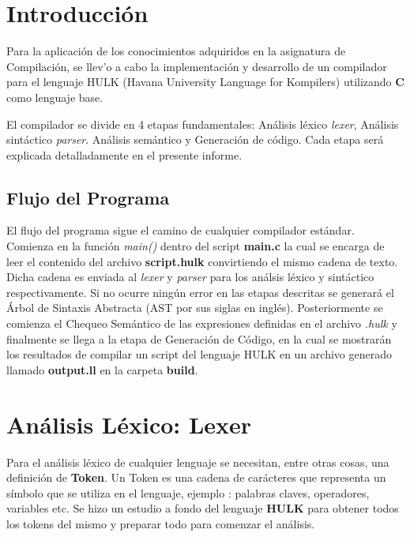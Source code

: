 \documentclass[11pt, a4paper, twoside]{article} %
\begin{document}
\clearpage

\clearpage %

\section{Introducción}
Para la aplicaci\'on de los conocimientos adquiridos en la asignatura de Compilaci\'on, se llev'o a cabo
la implementaci\'on y desarrollo de un compilador para el lenguaje HULK (Havana University Language for Kompilers)
utilizando \textbf{C} como lenguaje base.

El compilador se divide en 4 etapas fundamentales: An\'alisis l\'exico \textit{lexer}, An\'alisis sint\'actico \textit{parser}.
An\'alisis sem\'antico y Generaci\'on de c\'odigo. Cada etapa ser\'a explicada detalladamente en el presente informe.

\subsection{Flujo del Programa}
El flujo del programa sigue el camino de cualquier compilador est\'andar. Comienza en la funci\'on \textit{main()} dentro del script
\textbf{main.c} la cual se encarga de leer el contenido del archivo \textbf{script.hulk} convirtiendo el mismo cadena de texto. Dicha 
cadena es enviada al \textit{lexer} y \textit{parser} para los an\'alsis l\'exico y sint\'actico respectivamente. Si no ocurre ning\'un
error en las etapas descritas se generar\'a el \'Arbol de Sintaxis Abstracta (AST por sus siglas en ingl\'es). Posteriormente se comienza el
Chequeo Sem\'antico de las expresiones definidas en el archivo \textit{.hulk} y finalmente se llega a la etapa de Generaci\'on de C\'odigo,
en la cual se mostrar\'an los resultados de compilar un script del lenguaje HULK en un archivo generado llamado \textbf{output.ll} en 
la carpeta \textbf{build}.

\section{An\'alisis L\'exico: Lexer}
Para el an\'alisis l\'exico de cualquier lenguaje se necesitan, entre otras cosas, una definici\'on de \textbf{Token}. Un Token
es una cadena de car\'acteres que representa un s\'imbolo que se utiliza en el lenguaje, ejemplo : palabras claves, operadores, variables etc.
Se hizo un estudio a fondo del lenguaje \textbf{HULK} para obtener todos los tokens del mismo y preparar todo para comenzar el an\'alisis.
\end{document}
